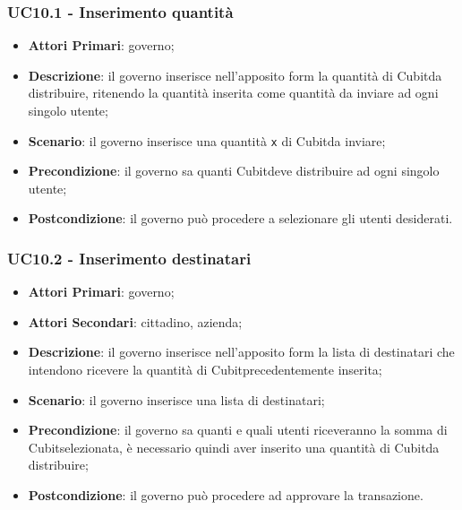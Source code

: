\subsubsection{UC10.1 - Inserimento quantità}
\begin{itemize}
	\item \textbf{Attori Primari}: governo;
	\item \textbf{Descrizione}: il governo inserisce nell'apposito form la quantità di Cubit\glosp da distribuire, ritenendo la quantità inserita come quantità da inviare ad ogni singolo utente;
	\item \textbf{Scenario}: il governo inserisce una quantità \texttt{x} di Cubit\glosp da inviare;
	\item \textbf{Precondizione}: il governo sa quanti Cubit\glosp deve distribuire ad ogni singolo utente;
	\item \textbf{Postcondizione}: il governo può procedere a selezionare gli utenti desiderati.
\end{itemize}
\subsubsection{UC10.2 - Inserimento destinatari}
\begin{itemize}
	\item \textbf{Attori Primari}: governo;
	\item \textbf{Attori Secondari}: cittadino, azienda;
	\item \textbf{Descrizione}: il governo inserisce nell'apposito form la lista di destinatari che intendono ricevere la quantità di Cubit\glosp precedentemente inserita;
	\item \textbf{Scenario}: il governo inserisce una lista di destinatari;
	\item \textbf{Precondizione}: il governo sa quanti e quali utenti riceveranno la somma di Cubit\glosp selezionata, è necessario quindi aver inserito una quantità di Cubit\glosp da distribuire;
	\item \textbf{Postcondizione}: il governo può procedere ad approvare la transazione.
\end{itemize}

